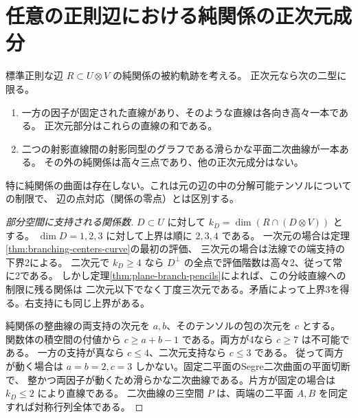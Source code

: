 \section{任意の正則辺における純関係の正次元成分}
\label{sec:pure-relation-curve-supports}
\begin{theorem}\label{thm:pure-relation-curve-supports}
標準正則な辺 $R\subset U\otimes V$ の純関係の被約軌跡を考える。
正次元なら次の二型に限る。
\begin{enumerate}
\item 一方の因子が固定された直線があり、そのような直線は各向き高々一本である。
正次元部分はこれらの直線の和である。
\item 二つの射影直線間の射影同型のグラフである滑らかな平面二次曲線が一本ある。
その外の純関係は高々三点であり、他の正次元成分はない。
\end{enumerate}
特に純関係の曲面は存在しない。これは元の辺の中の分解可能テンソルについての制限で、
辺の点対応（関係の零点）とは区別する。
\end{theorem}
\begin{proof}[部分空間に支持される関係数]
$D\subset U$ に対して $k_D=\dim(R\cap(D\otimes V))$ とする。
$\dim D=1,2,3$ に対して上界は順に $2,3,4$ である。
一次元の場合は定理\ref{thm:branching-centers-curve}の最初の評価、
三次元の場合は法線での端支持の下界2による。
二次元で $k_D\ge4$ なら $D^\perp$ の全点で評価階数は高々2、従って常に2である。
しかし定理\ref{thm:plane-branch-pencils}によれば、この分岐直線への制限に残る関係は
二次元以下でなく丁度三次元である。矛盾によって上界3を得る。右支持にも同じ上界がある。

純関係の整曲線の両支持の次元を $a,b$、そのテンソルの包の次元を $c$ とする。
関数体の積空間の付値から $c\ge a+b-1$ である。両方が4なら $c\ge7$ は不可能である。
一方の支持が真なら $c\le4$、二次元支持なら $c\le3$ である。
従って両方が動く場合は $a=b=2,c=3$ しかない。固定二平面のSegre二次曲面の平面切断で、
整かつ両因子が動くため滑らかな二次曲線である。片方が固定の場合は $k_D\le2$ により直線である。
二次曲線の三空間 $P$ は、両端の二平面 $A,B$ を同定すれば対称行列全体である。
\end{proof}

